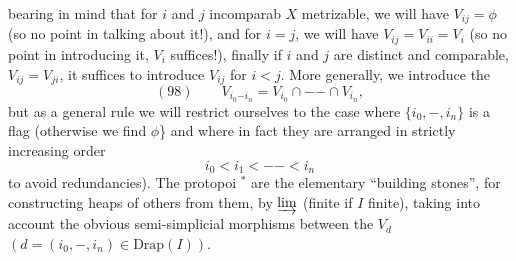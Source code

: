 
bearing in mind that for $i$ and $j$ incomparab  $X$ metrizable, we  will have $V_{ij}=\phi$  (so no point in talking about it!), and for $i=j$, we will have $V_{ij}=V_{ii}=V_i$ (so no point in introducing it, $V_i$ suffices!), finally  if $i$ and $j$ are distinct and comparable,   $V_{ij}=V_{ji}$, it suffices to introduce $V_{ij}$ for  $i<j$. More generally, we introduce the
\[(98)\qquad V_{i_0\mathord{-}i_n}=V_{i_0}\cap\mathord{-}\mathord{-}\cap V_{i_n},\]
but as a general rule we will restrict ourselves to the case where $\{i_0,\mathord{-},i_n\}$ is a flag (otherwise we find $\phi$\} and where in fact they are arranged in strictly increasing order
\[i_0<i_1<\mathord{-}\mathord{-}<i_n\]
\unsure{(}to avoid redundancies). The protopoi $^*$ are the elementary ``building stones'', for constructing heaps of others from them, by $\varinjlim$ (finite if $I$ finite), taking into account the obvious semi-simplicial morphisms between the $V_d$ $(d=(i_0,\mathord{-},i_n)\in\mathrm{Drap}(I))$.
